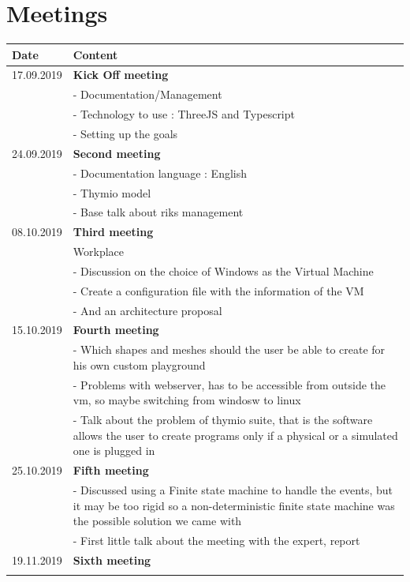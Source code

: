 \documentclass{scrbook}
\begin{document}
\chapter{Meetings}
\begin{tabular}{ | m{3cm} | m{10cm} | }
  \hline
  Date & Content \\
  \hline
  17.09.2019 & \textbf{Kick Off meeting}\\
  & - Documentation/Management\\
  & - Technology to use : ThreeJS and Typescript\\
  & - Setting up the goals\\
  \hline
  24.09.2019 & \textbf{Second meeting} \\
  & - Documentation language : English \\
  & - Thymio model \\
  & - Base talk about riks management \\
  \hline
  08.10.2019 & \textbf{Third meeting}\\
  & Workplace\\
  & - Discussion on the choice of Windows as the Virtual Machine \\
  & - Create a configuration file with the information of the VM \\
  & - And an architecture proposal \\
  \hline
  15.10.2019 & \textbf{Fourth meeting} \\
  & - Which shapes and meshes should the user be able to create for his own custom playground \\
  & - Problems with webserver, has to be accessible from outside the vm, so maybe switching from windosw to linux \\
  & - Talk about the problem of thymio suite, that is the software allows the user to create programs only if a physical or a simulated one is plugged in \\
  \hline
  25.10.2019 & \textbf{Fifth meeting} \\
  & - Discussed using a Finite state machine to handle the events, but it may be too rigid so a non-deterministic finite state machine was the possible solution we came with \\
  & - First little talk about the meeting with the expert, report\\
  \hline
  19.11.2019 & \textbf{Sixth meeting} \\
  & \\
  \hline
\end{tabular}
\end{document}
